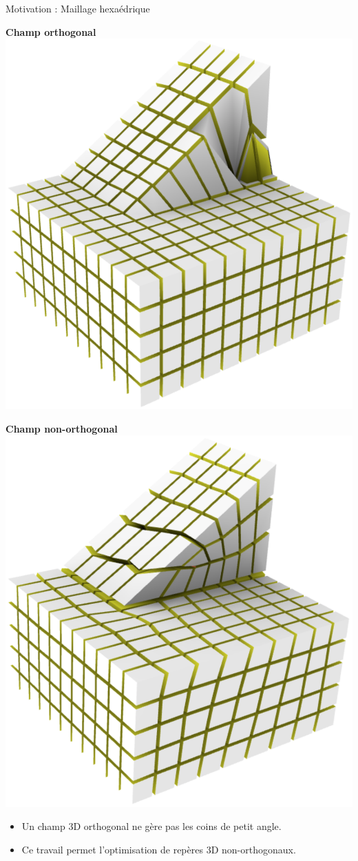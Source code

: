 
\begin{frame}{Motivation : Maillage hexaédrique}
    \centering
    
    \begin{minipage}[c]{0.48\textwidth}
    \centering 
    \textbf{Champ orthogonal}\\
    \vspace{0.3cm}
    \includegraphics[width=.7\linewidth]{img_spm_ff/slope_ortho_front.png}
    \end{minipage}%
    \hfill\vline\hfill
    \begin{minipage}[c]{0.48\textwidth}
    \centering 
    \textbf{Champ non-orthogonal}\\
    \vspace{0.3cm}
    \includegraphics[width=.7\linewidth]{img_spm_ff/slope_northo_front.png}
    \end{minipage}
    
    \vspace*{0.3cm}
    \begin{itemize}
        \item Un champ 3D orthogonal ne gère pas les coins de petit angle.
        \item Ce travail permet l'optimisation de repères 3D non-orthogonaux.
   \end{itemize}
    
\end{frame}

